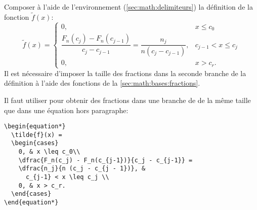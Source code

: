 \begin{exercice}
  Composer à l'aide de l'environnement 
  (\autoref{sec:math:delimiteurs}) la définition de la fonction
  $\tilde{f}(x)$:
  \begin{equation*}
    \tilde{f}(x) =
    \begin{cases}
      0, & x \leq c_0\\
      \dfrac{F_n(c_j) - F_n(c_{j-1})}{c_j - c_{j-1}} =
      \dfrac{n_j}{n (c_j - c_{j - 1})}, &  c_{j-1} < x \leq c_j\\
      0, & x > c_r.
    \end{cases}
  \end{equation*}
  Il est nécessaire d'imposer la taille des fractions dans la seconde
  branche de la définition à l'aide des fonctions de la
  \autoref{sec:math:bases:fractions}.
  \begin{sol}
    Il faut utiliser \cmd{\dfrac} pour obtenir des fractions dans une
    branche de  de la même taille que dans une équation hors
    paragraphe:
\begin{lstlisting}
\begin{equation*}
  \tilde{f}(x) =
  \begin{cases}
    0, & x \leq c_0\\
    \dfrac{F_n(c_j) - F_n(c_{j-1})}{c_j - c_{j-1}} =
    \dfrac{n_j}{n (c_j - c_{j - 1})}, &
      c_{j-1} < x \leq c_j \\
    0, & x > c_r.
  \end{cases}
\end{equation*}
\end{lstlisting}
  \end{sol}
\end{exercice}

